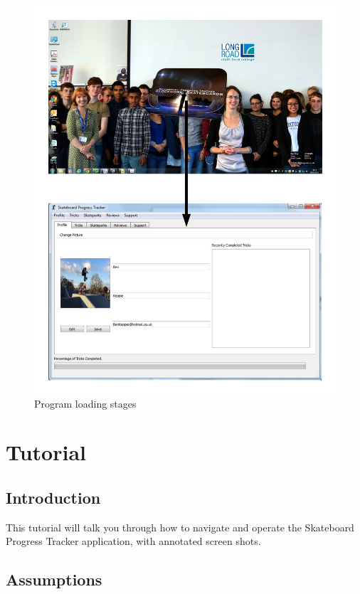 \begin{figure}[H]
    \includegraphics[width=\textwidth]{./Manual/Images/RunningProgram2.pdf}
    \caption{Program loading stages} \label{fig:Running Program2}
\end{figure}







\section{Tutorial}

\subsection{Introduction}

This tutorial will talk you through how to navigate and operate the Skateboard Progress Tracker application, with annotated screen shots.

\subsection{Assumptions}

